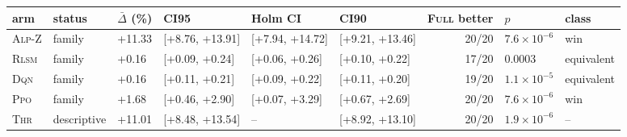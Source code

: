 \begin{tabular}{llllllrll}
\toprule
arm & status & $\bar\Delta$ (\%) & CI95 & Holm CI & CI90 & \textsc{Full} better & $p$ & class \\
\midrule
\textsc{Alp-Z} & family & +11.33 & [+8.76, +13.91] & [+7.94, +14.72] & [+9.21, +13.46] & 20/20 & $7.6\times10^{-6}$ & win \\
\textsc{Rlsm} & family & +0.16 & [+0.09, +0.24] & [+0.06, +0.26] & [+0.10, +0.22] & 17/20 & 0.0003 & equivalent \\
\textsc{Dqn} & family & +0.16 & [+0.11, +0.21] & [+0.09, +0.22] & [+0.11, +0.20] & 19/20 & $1.1\times10^{-5}$ & equivalent \\
\textsc{Ppo} & family & +1.68 & [+0.46, +2.90] & [+0.07, +3.29] & [+0.67, +2.69] & 20/20 & $7.6\times10^{-6}$ & win \\
\textsc{Thr} & descriptive & +11.01 & [+8.48, +13.54] & -- & [+8.92, +13.10] & 20/20 & $1.9\times10^{-6}$ & -- \\
\bottomrule
\end{tabular}
